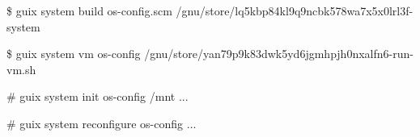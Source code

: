 \documentclass{beamer}
\begin{document}
\begin{frame}
  \begin{semiverbatim}
\$ guix system build os-config.scm
/gnu/store/lq5kbp84kl9q9ncbk578wa7x5x0lrl3f-system

\$ guix system vm os-config
/gnu/store/yan79p9k83dwk5yd6jgmhpjh0nxalfn6-run-vm.sh

\# guix system init os-config /mnt
\textrm{...}

\# guix system reconfigure os-config
\textrm{...}
  \end{semiverbatim}

\end{frame}





\end{document}
